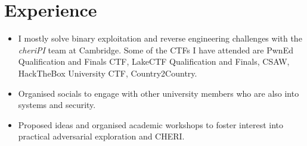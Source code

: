 \documentclass{resume}
\begin{document}

\section{Experience}

\begin{itemize}
  \item I mostly solve binary exploitation and reverse engineering challenges with the \textit{cheriPI} team at Cambridge. Some of the CTFs I have attended are PwnEd Qualification and Finals CTF, LakeCTF Qualification and Finals, CSAW, HackTheBox University CTF, Country2Country.
\end{itemize}

\begin{itemize}
  \item Organised socials to engage with other university members who are also into systems and security.
  \item Proposed ideas and organised academic workshops to foster interest into practical adversarial exploration and CHERI.
\end{itemize}




\end{document}
